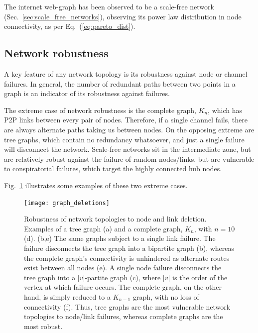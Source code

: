 The internet web-graph has been observed to be a scale-free network (Sec.~\ref{sec:scale_free_networks}), observing its power law distribution in node connectivity, as per Eq.~(\ref{eq:pareto_dist}).

%
%

\subsection{Network robustness}

A key feature of any network topology is its robustness against node or channel failures. In general, the number of redundant paths between two points in a graph is an indicator of its robustness against failures.

The extreme case of network robustness is the complete graph, $K_n$, which has P2P links between every pair of nodes. Therefore, if a single channel fails, there are always alternate paths taking us between nodes. On the opposing extreme are tree graphs, which contain no redundancy whatsoever, and just a single failure will disconnect the network. Scale-free networks sit in the intermediate zone, but are relatively robust against the failure of random nodes/links, but are vulnerable to conspiratorial failures, which target the highly connected hub nodes.

Fig.~\ref{fig:graph_deletions} illustrates some examples of these two extreme cases.

\begin{figure}[!htbp]
\texttt{[image: graph\_deletions]}
\caption{Robustness of network topologies to node and link deletion. Examples of a tree graph (a) and a complete graph, $K_n$, with \mbox{$n=10$} (d). (b,e) The same graphs subject to a single link failure. The failure disconnects the tree graph into a bipartite graph (b), whereas the complete graph's connectivity is unhindered as alternate routes exist between all nodes (e). A single node failure disconnects the tree graph into a $|v|$-partite graph (c), where $|v|$ is the order of the vertex at which failure occurs. The complete graph, on the other hand, is simply reduced to a $K_{n-1}$ graph, with no loss of connectivity (f). Thus, tree graphs are the most vulnerable network topologies to node/link failures, whereas complete graphs are the most robust.}\label{fig:graph_deletions}
\end{figure}